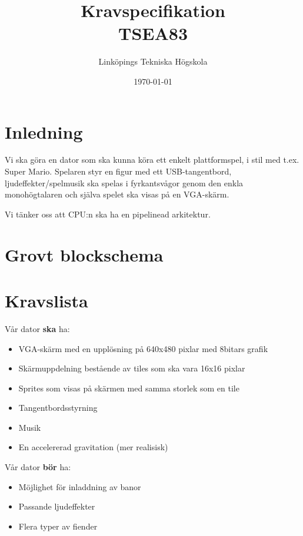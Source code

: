 \documentclass[a4paper,titlepage]{article}
\title{
\textbf{Kravspecifikation} \\
\large TSEA83}
\date{\today}
\author{Linköpings Tekniska Högskola}
\begin{document}
	\maketitle
	\newpage

\section{Inledning}
Vi ska göra en dator som ska kunna köra ett enkelt plattformspel, 
i stil med t.ex. Super Mario. Spelaren styr en figur med ett USB-tangentbord, 
ljudeffekter/spelmusik ska spelas i fyrkantsvågor genom den enkla 
monohögtalaren och själva spelet ska visas på en VGA-skärm.

Vi tänker oss att CPU:n ska ha en pipelinead arkitektur.

\section{Grovt blockschema}

\section{Kravslista}
Vår dator \textbf{ska} ha:
\begin{itemize}
    \item VGA-skärm med en upplösning på 640x480 pixlar med 8bitars grafik
    \item Skärmuppdelning bestående av tiles som ska vara 16x16 pixlar
    \item Sprites som visas på skärmen med samma storlek som en tile
	\item Tangentbordsstyrning
    \item Musik
    \item En accelererad gravitation (mer realisisk)
\end{itemize}
Vår dator \textbf{bör} ha:
\begin{itemize}
	\item Möjlighet för inladdning av banor
	\item Passande ljudeffekter 
	\item Flera typer av fiender
\end{itemize}
\end{document}
